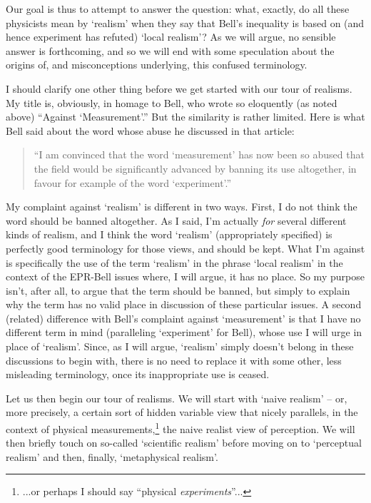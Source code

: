 \documentclass[12pt]{article}
\begin{document}
Our goal is thus to attempt to answer the
question:  what, exactly, do all these physicists mean by `realism'
when they say that Bell's inequality is based on (and hence experiment
has refuted) `local realism'?  As we will argue, no sensible answer 
is forthcoming, and so we will end with some speculation about the
origins of, and misconceptions underlying, this confused terminology.

I should clarify one other thing before we get started with our tour
of realisms.  My title is, obviously, in homage to Bell, who wrote
so eloquently (as noted above) ``Against `Measurement'.''  But the
similarity is rather limited.  Here is what Bell said about the word
whose abuse he discussed in that article:
\begin{quote}
``I am convinced that the word `measurement' has now
been so abused that the field would be significantly advanced by
banning its use altogether, in favour for example of the word
`experiment'.''  \cite[page 166]{bell}
\end{quote}
My complaint against `realism' is different in two ways.  First, I do
not think the word should be banned altogether.  As I said, I'm
actually \emph{for} several different kinds of realism, and I think
the word `realism' (appropriately specified) is perfectly good
terminology for those views, and should be kept.  What I'm against is
specifically the use of the term `realism' in the phrase `local realism' 
in the context of the EPR-Bell
issues where, I will argue, it has no place.  So my purpose isn't, 
after all, to argue that the term should be banned, but simply to 
explain why the term has no valid place in discussion of these 
particular issues.  A second (related) difference with Bell's
complaint against `measurement' is that I have no different term 
in mind (paralleling `experiment' for Bell), whose use I will urge
in place of `realism'.  Since, as I will argue, `realism' simply 
doesn't belong in these discussions to begin with, there is no need to 
replace it with some other, less misleading terminology, once its 
inappropriate use is ceased. 

Let us then begin our tour of realisms.  We will start with `naive
realism' -- or, more precisely, a certain sort of hidden variable
view that nicely parallels, in the context of physical 
measurements,\footnote{...or perhaps I should say ``physical 
\emph{experiments}''...}
the naive realist view of perception.  We will then briefly touch on
so-called `scientific realism' before moving on to `perceptual
realism' and then, finally, `metaphysical realism'.  
\end{document}
